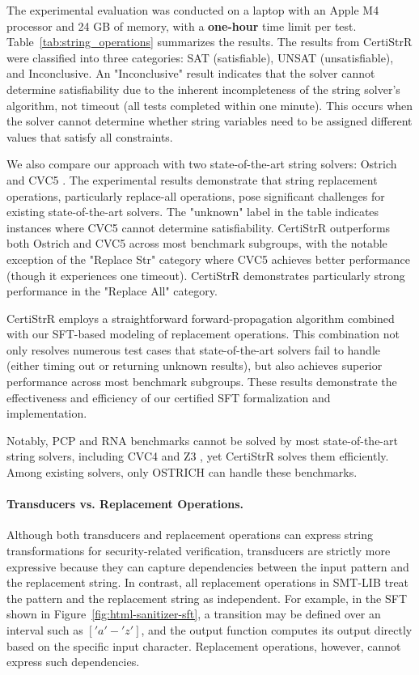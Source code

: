 The experimental evaluation was conducted on a laptop with an Apple M4 processor and 24 GB of memory, with a \textbf{one-hour} time limit per test. Table~\ref{tab:string_operations} summarizes the results. The results from CertiStrR were classified into three categories: SAT (satisfiable), UNSAT (unsatisfiable), and Inconclusive. An "Inconclusive" result indicates that the solver cannot determine satisfiability due to the inherent incompleteness of the string solver's algorithm, not timeout (all tests completed within one minute). This occurs when the solver cannot determine whether string variables need to be assigned different values that satisfy all constraints.

We also compare our approach with two state-of-the-art string solvers: Ostrich \cite{pacmpl/ChenFHHHKLRW22} and CVC5 \cite{cvc5}.
The experimental results demonstrate that string replacement operations, particularly replace-all operations, pose significant challenges for existing state-of-the-art solvers.
The "unknown" label in the table indicates instances where CVC5 cannot determine satisfiability. CertiStrR outperforms both Ostrich and CVC5 across most benchmark subgroups, with the notable exception of the "Replace Str" category where CVC5 achieves better performance (though it experiences one timeout). CertiStrR demonstrates particularly strong performance in the "Replace All" category.

CertiStrR employs a straightforward forward-propagation algorithm \cite{cpp/KanLRS22} combined with our SFT-based modeling of replacement operations. This combination not only resolves numerous test cases that state-of-the-art solvers fail to handle (either timing out or returning unknown results), but also achieves superior performance across most benchmark subgroups. These results demonstrate the effectiveness and efficiency of our certified SFT formalization and implementation.

Notably, PCP and RNA benchmarks cannot be solved by most state-of-the-art string
solvers, including CVC4 \cite{cvc4} and Z3 \cite{Z3-str3}, yet CertiStrR solves
them efficiently. Among existing solvers, only OSTRICH \cite{pacmpl/ChenFHHHKLRW22} can handle these benchmarks.


\paragraph{Transducers vs. Replacement Operations.}  
Although both transducers and replacement operations can express string transformations for security-related verification, transducers are strictly more expressive because they can capture dependencies between the input pattern and the replacement string. In contrast, all replacement operations in SMT-LIB treat the pattern and the replacement string as independent. For example, in the SFT shown in Figure~\ref{fig:html-sanitizer-sft}, a transition may be defined over an interval such as $['a'-'z']$, and the output function computes its output directly based on the specific input character. Replacement operations, however, cannot express such dependencies.  


